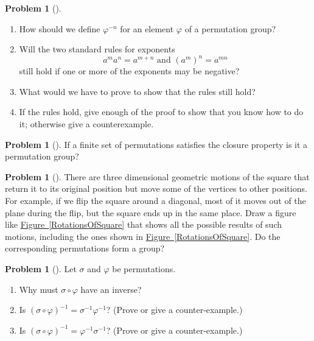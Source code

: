 \documentclass[10pt,]{book}
\theoremstyle{plain}
\theoremstyle{definition}
\newtheorem{activity}[project]{Problem}
\theoremstyle{definition}
\numberwithin{equation}{chapter}
\begin{document}
\begin{activity}[] \label{activity-253}
\leavevmode%
\begin{enumerate}[font=\bfseries,label=(\alph*),ref=\alph*]
\item\label{task-186} \marginsymbol[-2.5em]{} How should we define \(\varphi^{-n}\) for an element \(\varphi\) of a permutation group?%
\item\label{task-187} \marginsymbol[-2.5em]{} Will the two standard rules for exponents%
\begin{equation*}
a^ma^n=a^{m+n} \mbox{\ and\ }  (a^m)^n = a^{mn}
\end{equation*}
still hold if one or more of the exponents may be negative?%
\item\label{task-188} \marginsymbol[-2.5em]{} What would we have to prove to show that the rules still hold?%
\item\label{task-189} \marginsymbol[-2.5em]{} If the rules hold, give enough of the proof to show that you know how to do it; otherwise give a counterexample.%
\end{enumerate}
\end{activity}
\begin{activity}[] \label{activity-254}
If a finite set of permutations satisfies the closure property is it a permutation group?%
\end{activity}
\begin{activity}[] \label{dihedral1}
There are three dimensional geometric motions of the square that return it to its original position but move some of the vertices to other positions. For example, if we flip the square around a diagonal, most of it moves out of the plane during the flip, but the square ends up in the same place. Draw a figure like \hyperref[RotationsOfSquare]{Figure~\ref{RotationsOfSquare}} that shows all the possible results of such motions, including the ones shown in \hyperref[RotationsOfSquare]{Figure~\ref{RotationsOfSquare}}. Do the corresponding permutations form a group?%
\end{activity}
\begin{activity}[]\marginsymbol[-1em]{} \label{activity-256}
Let \(\sigma\) and \(\varphi\) be permutations.%
\begin{enumerate}[font=\bfseries,label=(\alph*),ref=\alph*]
\item\label{task-190} \marginsymbol[-2.5em]{} Why must \(\sigma\circ\varphi\) have an inverse?%
\item\label{task-191} \marginsymbol[-2.5em]{} Is \((\sigma\circ\varphi)^{-1}=\sigma^{-1}\varphi^{-1}\)? (Prove or give a counter-example.)%
\item\label{task-192} \marginsymbol[-2.5em]{} Is \((\sigma\circ\varphi)^{-1}= \varphi^{-1}\sigma^{-1}\)? (Prove or give a counter-example.)%
\end{enumerate}
\end{activity}
\end{document}

